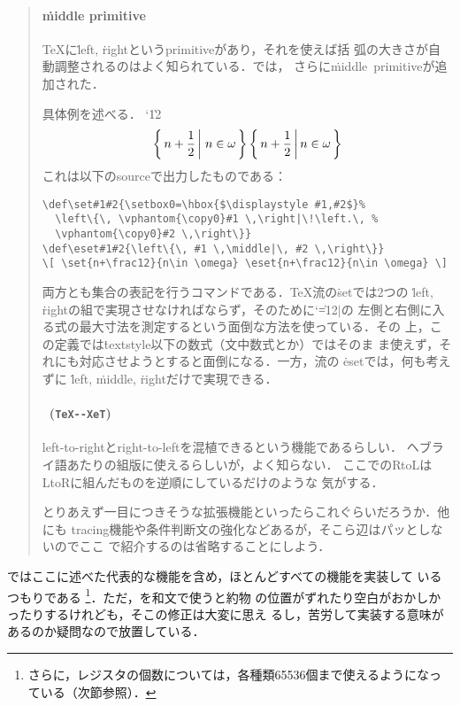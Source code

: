 \documentclass[a4paper,11pt,nomag,dvipdfmx]{jsarticle}
\begin{document}
\begin{quotation}
\paragraph{\.{middle} primitive}
\TeX に\.{left}, \.{right}というprimitiveがあり，それを使えば括
弧の大きさが自動調整されるのはよく知られている．\eTeX では，
さらに\.{middle}\ primitiveが追加された．

具体例を述べる．
{\catcode`\|12
\def\set#1#2{\setbox0=\hbox{$\displaystyle #1,#2$}%
\left\{\, \vphantom{\copy0}#1 \,\right|\!\left.\, \vphantom{\copy0}#2 \,\right\}}
\def\eset#1#2{\left\{\, #1 \,\middle|\, #2 \,\right\}}
\[ \set{n+\frac12}{n\in \omega} \eset{n+\frac12}{n\in \omega} \]}
これは以下のsourceで出力したものである：

{\narrowbaselines
\begin{verbatim}
\def\set#1#2{\setbox0=\hbox{$\displaystyle #1,#2$}%
  \left\{\, \vphantom{\copy0}#1 \,\right|\!\left.\, %
  \vphantom{\copy0}#2 \,\right\}}
\def\eset#1#2{\left\{\, #1 \,\middle|\, #2 \,\right\}}
\[ \set{n+\frac12}{n\in \omega} \eset{n+\frac12}{n\in \omega} \]
\end{verbatim}}
両方とも集合の表記を行うコマンドである．\TeX 流の\.{set}では2つの
\.{left}, \.{right}の組で実現させなければならず，そのために{\catcode`\|=12$|$}の
左側と右側に入る式の最大寸法を測定するという面倒な方法を使っている．その
上，この定義では\.{textstyle}以下の数式（文中数式とか）ではそのま
ま使えず，それにも対応させようとすると面倒になる．一方，\eTeX 流の
\.{eset}では，何も考えずに
\.{left}, \.{middle}, \.{right}だけで実現できる．

\paragraph{\TeXXeT\ \textmd{(\texttt{TeX-{}-XeT})}}
left-to-rightとright-to-leftを混植できるという機能であるらしい．
ヘブライ語あたりの組版に使えるらしいが，よく知らない．
ここでのRtoLはLtoRに組んだものを逆順にしているだけのような
気がする．

\medskip

とりあえず一目につきそうな拡張機能といったらこれぐらいだろうか．他にも
tracing機能や条件判断文の強化などあるが，そこら辺はパッとしないのでここ
で紹介するのは省略することにしよう．
\end{quotation}

\epTeX ではここに述べた代表的な機能を含め，ほとんどすべての機能を実装して
いるつもりである
\footnote{%
  さらに，レジスタの個数については，各種類65536個まで使えるようになっている（次節参照）．
}．ただ，\TeXXeT を和文で使うと約物
の位置がずれたり空白がおかしかったりするけれども，そこの修正は大変に思え
るし，苦労して実装する意味があるのか疑問なので放置している．
\end{document}

